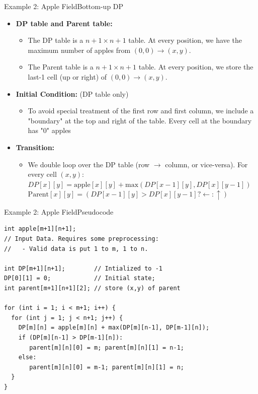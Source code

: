 \begin{frame}{Example 2: Apple Field}{Bottom-up DP}
  \begin{itemize}
  \item {\bf DP table and Parent table:}
  \begin{itemize}
    \item The DP table is a $n+1\times n+1$ table. At every position, we have the maximum number of apples from $(0,0)\to(x,y)$.
    \item The Parent table is a $n+1\times n+1$ table. At every position, we store the last-1 cell (up or right) of $(0,0)\to(x,y)$.
  \end{itemize}

  \item {\bf Initial Condition:} (DP table only)
  \begin{itemize}
    \item To avoid special treatment of the first row and first column, we include a "boundary" at the top and right of the table. Every cell at the boundary has "0" apples
  \end{itemize}

  \item {\bf Transition:}
  \begin{itemize}
    \item We double loop over the DP table (row $\to$ column, or vice-versa). For every cell $(x,y)$:\\
    $DP[x][y] = \text{apple}[x][y] + \text{max}(DP[x-1][y],DP[x][y-1])$\\
    $\text{Parent}[x][y] = (DP[x-1][y] > DP[x][y-1]?\leftarrow:\uparrow)$
  \end{itemize}
  \end{itemize}
\end{frame}

\begin{frame}[fragile]{Example 2: Apple Field}{Pseudocode}
  {\smaller
  \begin{block}{}
\begin{verbatim}
int apple[m+1][n+1];
// Input Data. Requires some preprocessing:
//   - Valid data is put 1 to m, 1 to n.

int DP[m+1][n+1];        // Intialized to -1
DP[0][1] = 0;            // Initial state;
int parent[m+1][n+1][2]; // store (x,y) of parent

for (int i = 1; i < m+1; i++) {
  for (int j = 1; j < n+1; j++) {
    DP[m][n] = apple[m][n] + max(DP[m][n-1], DP[m-1][n]);
    if (DP[m][n-1] > DP[m-1][n]):
       parent[m][n][0] = m; parent[m][n][1] = n-1;
    else:
       parent[m][n][0] = m-1; parent[m][n][1] = n;
  }
}
\end{verbatim}
\end{block}
  }
\end{frame}

